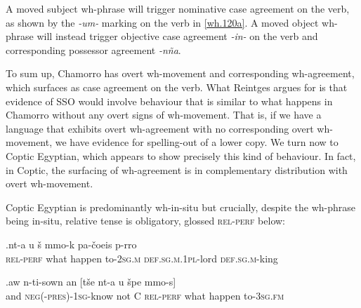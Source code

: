 \documentclass{glossa}
\begin{document}
A moved subject wh-phrase will trigger nominative case agreement on the verb, as shown by the \textit{-um-} marking on the verb in \ref{wh.120a}. A moved object wh-phrase will instead trigger objective case agreement \textit{-in-} on the verb and corresponding possessor agreement \textit{-n\~na}.

%

To sum up, Chamorro has overt wh-movement and corresponding wh-agreement, which surfaces as case agreement on the verb. What Reintges argues for is that evidence of SSO would involve behaviour that is similar to what happens in Chamorro without any overt signs of wh-movement. That is, if we have a language that exhibits overt wh-agreement with no corresponding overt wh-movement, we have evidence for spelling-out of a lower copy. We turn now to Coptic Egyptian, which appears to show precisely this kind of behaviour. In fact, in Coptic, the surfacing of wh-agreement is in complementary distribution with overt wh-movement.

Coptic Egyptian is predominantly wh-in-situ but crucially, despite the wh-phrase being in-situ, relative tense is obligatory, glossed \textsc{rel-perf} below:

\exg.\label{wh.130}{\textschwa}nt-a u \v{s}{\textopeno} {\textschwa}mmo-k pa-\v{c}oeis p-{\textschwa}rro\\
   \textsc{rel-perf} what happen to-\textsc{2sg.m} \textsc{def.sg.m.1pl}-lord \textsc{def.sg.m}-king\\

\exg.\label{wh.140}aw{\textopeno} n-ti-sown an [t\v{s}e nt-a u \v{s}{\textopeno}pe {\textschwa}mmo-s]\\
   and \textsc{neg(-pres)-1sg}-know not C \textsc{rel-perf} what happen to-\textsc{3sg.fm}\\
\end{document}
